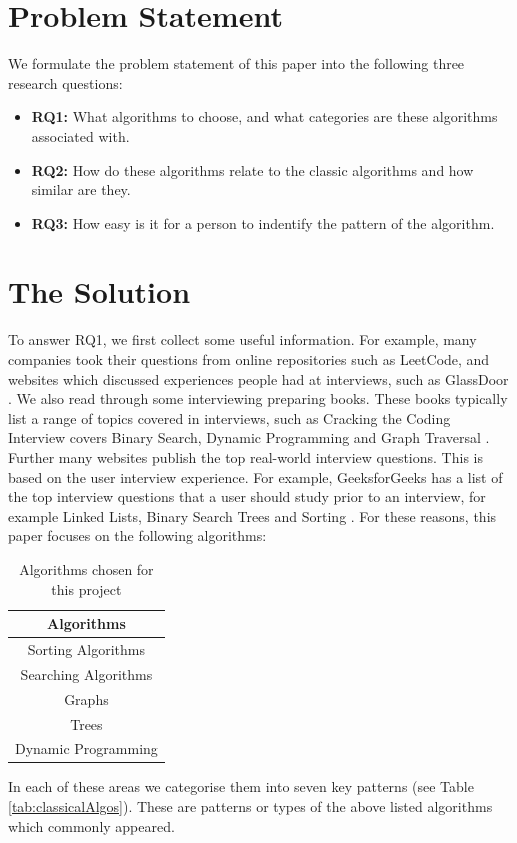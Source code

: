 \documentclass[10pt,twocolumn,hidelinks]{IEEEtran}
\begin{document}
\section{Problem Statement}
\label{label:problemstmt}
We formulate the problem statement of this paper into the following three research questions:
\begin{itemize}
\item \textbf{RQ1: }What algorithms to choose, and what categories are these algorithms associated with. 
\item \textbf{RQ2: }How do these algorithms relate to the classic algorithms and how similar are they.
\item \textbf{RQ3: }How easy is it for a person to indentify the pattern of the algorithm.
\end{itemize}

\section{The Solution}
To answer RQ1, we first collect some useful information. For example, many companies took their questions from online repositories such as LeetCode, and websites which discussed experiences people had at interviews, such as GlassDoor \cite{glassdoor}. We also read through some interviewing preparing books. These books typically list a range of topics covered in interviews, such as Cracking the Coding Interview covers Binary Search, Dynamic Programming and Graph Traversal \cite{mcdowell2015cracking}. Further many websites publish the top real-world interview questions. This is based on the user interview experience. For example, GeeksforGeeks has a list of the top interview questions that a user should study prior to an interview, for example Linked Lists, Binary Search Trees and Sorting \cite{geeksalgos}. For these reasons, this paper focuses on the following algorithms:

\begin{table}[h]
\centering
	\begin{tabular}{| c | } \hline
		   Algorithms \\ \hline
		Sorting Algorithms\\ \hline
		Searching Algorithms\\ \hline
		Graphs  \\ \hline
		Trees  \\ \hline
		Dynamic Programming \\ \hline
	\end{tabular}
	\caption{Algorithms chosen for this project}
	\label{tab:fiveareas}
\end{table}
In each of these areas we categorise them into seven key patterns (see Table \ref{tab:classicalAlgos}). These are patterns or types of the above listed algorithms which commonly appeared.
 
\end{document}
